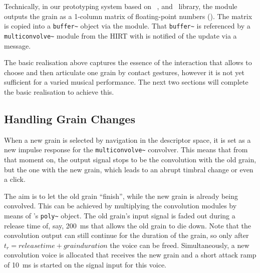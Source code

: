 Technically, in our prototyping system based on \catart\, \ftm{}, and \gabor\ library, the  module outputs the grain as a 1-column matrix of floating-point numbers ().  The matrix is copied into a \verb|buffer~| object via the  module.
That \verb|buffer~| is referenced by a \verb|multiconvolve~| module from the HIRT with is notified of the update via a message.


The basic realisation above captures the essence of the interaction that allows to choose and then articulate one grain by contact gestures, however it is not yet sufficient for a varied musical performance.  The next two sections will complete the basic realisation to achieve this.


\subsection{Handling Grain Changes}\label{sec:set}

When a new grain is selected by navigation in the descriptor space, it is set as a new impulse response for the \verb|multiconvolve~| convolver.  This means that from that moment on, the output signal stops to be the convolution with the old grain, but the one with the new grain, which leads to an abrupt timbral change or even a click.

The aim is to let the old grain ``finish'', while the new grain is already being convolved.  This can be achieved by multiplying the convolution modules by means of \maxmsp's \verb|poly~| object.  The old grain's input signal is faded out during a release time of, say, 200~ms that allows the old grain to die down.  Note that the convolution output can still continue for the duration of the grain, so only after $t_r = release time + grain duration$ the voice can be freed.  Simultaneously, a new convolution voice is allocated that receives the new grain and a short attack ramp of 10~ms is started on the signal input for this voice.

